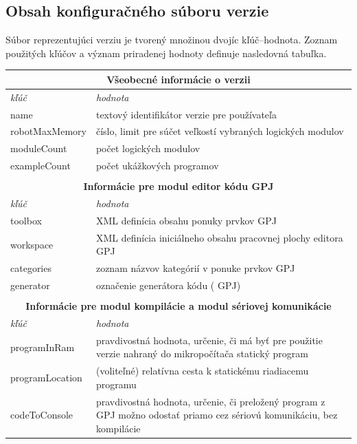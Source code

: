 \subsection{Obsah konfiguračného súboru verzie}
\label{sub:konfig-subor-verzie}
Súbor reprezentujúci verziu je tvorený množinou dvojíc kľúč--hodnota. Zoznam použitých kľúčov a význam priradenej hodnoty definuje nasledovná tabuľka.

\begin{table}\footnotesize
\centering
\begin{tabular}{ |p{3.8cm}|p{10cm}|  }
 \hline
	\multicolumn{2}{|c|}{\textbf{Všeobecné informácie o verzii}} \\
 \hline
	\textit{kľúč} & \textit{hodnota}\\
 \hline
	name&textový identifikátor verzie pre používateľa\\
	robotMaxMemory&číslo, limit pre súčet veľkostí vybraných logických modulov\\
	moduleCount&počet logických modulov\\
	exampleCount&počet ukážkových programov\\
 \hline

 \multicolumn{2}{c}{} \\
 \multicolumn{2}{c}{\textbf{Informácie pre modul editor kódu GPJ}} \\
 \hline
	\textit{kľúč} & \textit{hodnota}\\
 \hline
 	toolbox&XML definícia obsahu ponuky prvkov GPJ\\
 	workspace&XML definícia iniciálneho obsahu pracovnej plochy editora GPJ\\
 	categories&zoznam názvov kategórií v ponuke prvkov GPJ\\
 	generator&označenie generátora kódu (\uv{prekladača} GPJ)\\
 \hline

 \multicolumn{2}{c}{} \\
 \multicolumn{2}{c}{\textbf{Informácie pre modul kompilácie a modul sériovej komunikácie}} \\
 \hline
	\textit{kľúč} & \textit{hodnota}\\
 \hline
	programInRam&pravdivostná hodnota, určenie, či má byť pre použitie verzie nahraný do mikropočítača statický program\\
	programLocation&(voliteľné) relatívna cesta k statickému riadiacemu programu\\
	codeToConsole&pravdivostná hodnota, určenie, či preložený program z GPJ možno odostať priamo cez sériovú komunikáciu, bez kompilácie\\
 \hline


\end{tabular}
\end{table}
